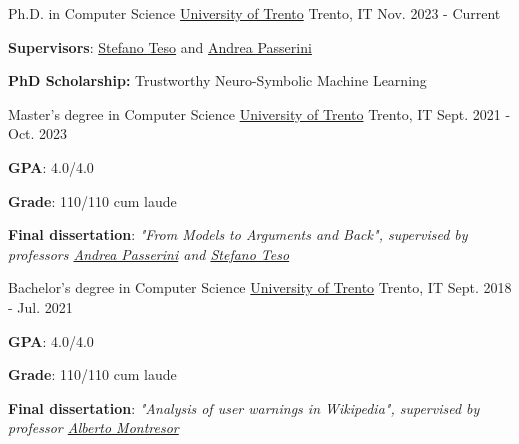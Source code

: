 \documentclass[11pt, a4paper]{awesome-cv}
\begin{document}
\begin{cventries}
  \cventry
    {Ph.D. in Computer Science} %
    {\href{https://www.unitn.it/en}{University of Trento}} %
    {Trento, IT} %
    {Nov. 2023 - Current} %
    {
      \begin{cvitems}
        \item {\textbf{Supervisors}: \href{https://stefanoteso.github.io/}{Stefano Teso} and \href{https://disi.unitn.it/~passerini/index.html}{Andrea Passerini}}
        \item {\textbf{PhD Scholarship:} Trustworthy Neuro-Symbolic Machine Learning}
      \end{cvitems}
    }

  \cventry
    {Master's degree in Computer Science} %
    {\href{https://www.unitn.it/en}{University of Trento}} %
    {Trento, IT} %
    {Sept. 2021 - Oct. 2023} %
    {
      \begin{cvitems}
        \item {\textbf{GPA}: 4.0/4.0}
        \item {\textbf{Grade}: 110/110 cum laude}
        \item {\textbf{Final dissertation}: \em{"From Models to Arguments and Back"}, supervised by professors \href{https://disi.unitn.it/~passerini/index.html}{Andrea Passerini} and \href{https://stefanoteso.github.io/}{Stefano Teso}}
      \end{cvitems}
    }

  \cventry
    {Bachelor's degree in Computer Science} %
    {\href{https://www.unitn.it/en}{University of Trento}} %
    {Trento, IT} %
    {Sept. 2018 - Jul. 2021} %
    {
      \begin{cvitems} %
        \item {\textbf{GPA}: 4.0/4.0}
        \item {\textbf{Grade}: 110/110 cum laude}
        \item {\textbf{Final dissertation}: \em{"Analysis of user warnings in Wikipedia"}, supervised by professor \href{https://cricca.disi.unitn.it/montresor/}{Alberto Montresor}}
      \end{cvitems}
    }

\end{cventries}
\end{document}
